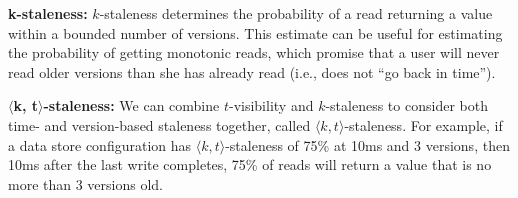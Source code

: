 \textbf{k-staleness:} $k$-staleness determines the probability of a
read returning a value within a bounded number of versions. This
estimate can be useful for estimating the probability of getting 
monotonic reads, which promise that a user will
never read older versions than she has already read (i.e., does
not ``go back in time'').

\textbf{$\langle$k, t$\rangle$-staleness:} We can combine $t$-visibility
and $k$-staleness to consider both time- and version-based staleness
together, called $\langle k, t \rangle$-staleness. For example, if a
data store configuration has $\langle k, t \rangle$-staleness of 75\%
at 10ms and 3 versions, then 10ms after the last write completes, 75\%
of reads will return a value that is no more than 3 versions old.



